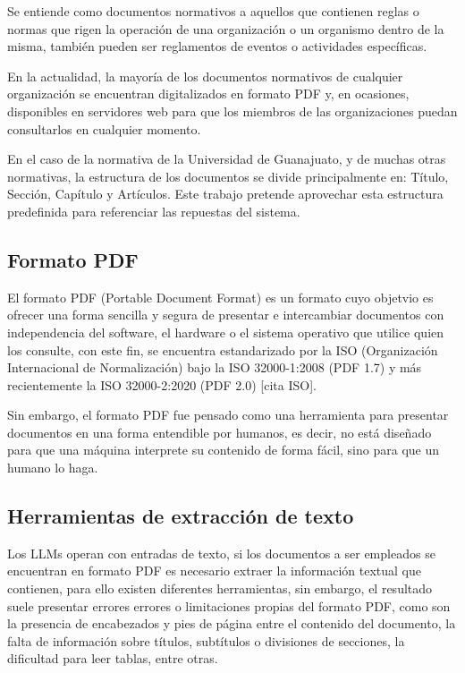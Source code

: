Se entiende como documentos normativos a aquellos que contienen reglas o
normas que rigen la operación de una organización o un organismo dentro de la
misma, también pueden ser reglamentos de eventos o actividades específicas.

En la actualidad, la mayoría de los documentos normativos de cualquier
organización se encuentran digitalizados en formato PDF y, en ocasiones, disponibles
en servidores web para que los miembros de las organizaciones puedan consultarlos
en cualquier momento.

En el caso de la normativa de la Universidad de Guanajuato, y de muchas otras
normativas, la estructura de los documentos se divide principalmente en:
Título, Sección, Capítulo y Artículos. Este trabajo pretende aprovechar esta
estructura predefinida para referenciar las repuestas del sistema.

\subsection{Formato PDF}

El formato PDF (Portable Document Format) es un formato cuyo objetvio es
ofrecer una forma sencilla y segura de presentar e intercambiar documentos con
independencia del software, el hardware o el sistema operativo que utilice quien
los consulte, con este fin, se encuentra estandarizado por la
ISO (Organización Internacional de Normalización) bajo la ISO 32000-1:2008
(PDF 1.7) y más recientemente la ISO 32000-2:2020 (PDF 2.0) [cita ISO].

Sin embargo, el formato PDF fue pensado como una herramienta para presentar
documentos en una forma entendible por humanos, es decir, no está
diseñado para que una máquina interprete su contenido de forma fácil, sino
para que un humano lo haga.

\subsection{Herramientas de extracción de texto}

Los LLMs operan con entradas de texto, si los documentos a ser empleados
se encuentran en formato PDF es necesario extraer la información textual que
contienen, para ello existen diferentes herramientas, sin embargo, el
resultado suele presentar errores errores o limitaciones propias del formato
PDF, como son la presencia de encabezados y pies de página entre el contenido
del documento, la falta de información sobre títulos, subtítulos o divisiones
de secciones, la dificultad para leer tablas, entre otras.

